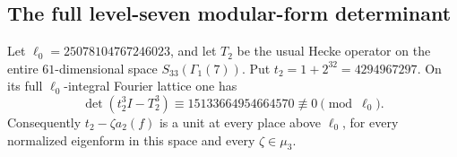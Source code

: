 \subsection{The full level-seven modular-form determinant}
\label{sec:gl2-minus7}

\begin{proposition}[K17-MINUS7-GL2]\label{prop:minus7-gl2}
Let \(\ell_0=25078104767246023\), and let \(T_2\) be the usual
Hecke operator on the entire \(61\)-dimensional space
\(S_{33}(\Gamma_1(7))\). Put \(t_2=1+2^{32}=4294967297\).
On its full \(\ell_0\)-integral Fourier lattice one has
\[
 \det(t_2^3I-T_2^3)
    \equiv15133664954664570\not\equiv0\pmod{\ell_0}.
 \tag{G7.1}
\]
Consequently \(t_2-\zeta a_2(f)\) is a unit at every place above
\(\ell_0\), for every normalized eigenform in this space and every
\(\zeta\in\mu_3\).
\end{proposition}


